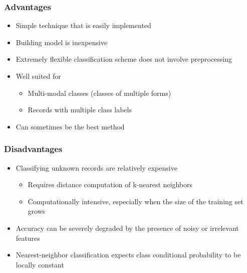 \documentclass[12pt]{article}
\newenvironment{QandA}{\begin{enumerate}[label=\bfseries\arabic*.]\bfseries}
{\end{enumerate}}
\newenvironment{answered}{\par\normalfont\color{Sepia}}{}
\begin{document}
\begin{QandA}
\begin{answered}
        \subsubsection*{Advantages}
            \begin{itemize}
                \item Simple technique that is easily implemented
                \item Building model is inexpensive 
                \item Extremely flexible classification scheme \textemdash{} does not involve preprocessing
                \item Well suited for
                    \begin{itemize}
                        \item Multi-modal classes (classes of multiple forms)
                        \item Records with multiple class labels
                    \end{itemize}
                \item Can sometimes be the best method
            \end{itemize}
        \subsubsection*{Disadvantages}
            \begin{itemize}
                \item Classifying unknown records are relatively expensive
                    \begin{itemize}
                        \item Requires distance computation of k-nearest neighbors
                        \item Computationally intensive, especially when the size of the training set grows
                    \end{itemize}
                \item Accuracy can be severely degraded by the presence of noisy or irrelevant features
                \item Nearest-neighbor classification expects class conditional probability to be locally constant
            \end{itemize}
    \end{answered}
\end{QandA}
\end{document}
